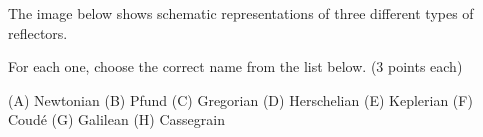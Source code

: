 The image below shows schematic representations of three different types of
reflectors.


For each one, choose the correct name from the list below. (3 points each)

(A) Newtonian \quad (B) Pfund \quad (C) Gregorian \quad (D) Herschelian \quad
(E) Keplerian \quad (F) Coud\'e \quad (G) Galilean \quad (H) Cassegrain
